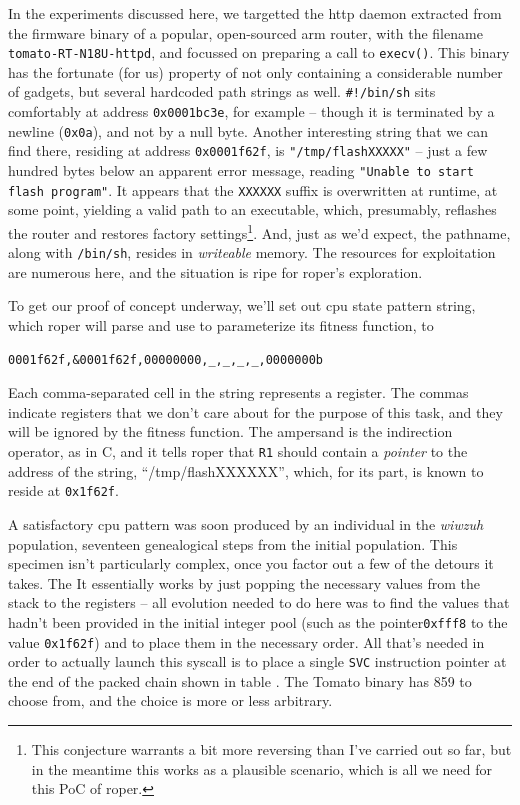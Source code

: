 \documentclass[12pt,glossary]{dalthesis}
\begin{document}
In the experiments discussed here, we targetted the \gls{http} daemon extracted from
the firmware binary of a popular, open-sourced \gls{arm} router, with the filename
\texttt{tomato-RT-N18U-httpd}, and focussed on preparing a call to \texttt{execv()}. This binary
has the fortunate (for us) property of not only containing a considerable number
of gadgets, but several hardcoded path strings as well. \texttt{\#!/bin/sh} sits comfortably
at address \texttt{0x0001bc3e}, for example -- though it is terminated by a newline (\texttt{0x0a}),
and not by a null byte. Another interesting string that we can find there, residing
at address \texttt{0x0001f62f}, is \texttt{"/tmp/flashXXXXX"} -- just a few hundred bytes below an
apparent error message, reading \texttt{"Unable to start flash program"}. It appears that
the \texttt{XXXXXX} suffix is overwritten at runtime, at some point, yielding a valid path
to an executable, which, presumably, reflashes the router and restores factory
settings\footnote{This conjecture warrants a bit more reversing than I've carried out so far,
  but in the meantime this works as a plausible scenario, which is all we need
  for this PoC of \gls{roper}.}. And, just as we'd expect, the pathname, along with \texttt{/bin/sh}, resides in 
\emph{writeable} memory. The resources for exploitation are numerous here, and the
situation is ripe for \gls{roper}'s exploration.

To get our proof of concept underway, we'll set out \gls{cpu} state pattern string,
which \gls{roper} will parse and use to parameterize its fitness function, to
\begin{verbatim}
0001f62f,&0001f62f,00000000,_,_,_,_,0000000b
\end{verbatim}
Each comma-separated cell in the string represents a register. The commas indicate
registers that we don't care about for the purpose of this task, and they will be
ignored by the fitness function. The ampersand is the indirection operator, as in C, 
and it tells \gls{roper} that \texttt{R1} should contain a \emph{pointer} to the address of the
string, ``/tmp/flashXXXXXX'', which, for its part, is known to reside at \texttt{0x1f62f}. 

A satisfactory \gls{cpu} pattern was soon produced by an individual in the \emph{wiwzuh} 
population, seventeen genealogical steps from the initial population. This specimen
isn't particularly complex, once you factor out a few of the detours it takes. The
It essentially works by just popping the necessary values from the stack to the
registers -- all evolution needed to do here was to find the values that 
hadn't been provided in the initial integer pool (such as the pointer\texttt{0xfff8} to the
value \texttt{0x1f62f}) and to place them in the necessary order. All that's needed in order
to actually launch this syscall is to place a single \texttt{SVC} instruction pointer
at the end of the packed chain shown in table \label{fig:wiwzuh}. The Tomato binary
has 859 to choose from, and the choice is more or less arbitrary. 
\end{document}
